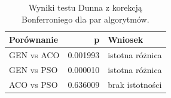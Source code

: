 \begin{table}
\caption{Wyniki testu Dunna z korekcją Bonferroniego dla par algorytmów.}
\label{tab:dunn_pairs}
\begin{tabular}{lrl}
\toprule
Porównanie & p & Wniosek \\
\midrule
GEN vs ACO & 0.001993 & istotna różnica \\
GEN vs PSO & 0.000010 & istotna różnica \\
ACO vs PSO & 0.636009 & brak istotności \\
\bottomrule
\end{tabular}
\end{table}
